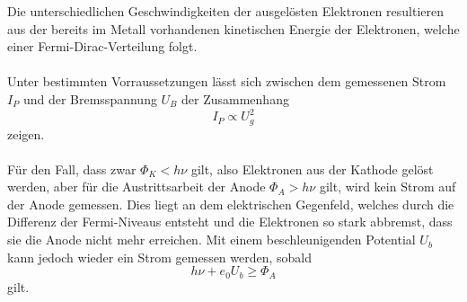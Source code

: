 \noindent
Die unterschiedlichen Geschwindigkeiten der ausgelösten Elektronen resultieren aus der bereits im Metall vorhandenen kinetischen Energie der
Elektronen, welche einer Fermi-Dirac-Verteilung folgt.
\\
\\
\noindent
Unter bestimmten Vorraussetzungen lässt sich zwischen dem gemessenen Strom $I_{P}$ und der Bremsspannung $U_B$ der Zusammenhang
\begin{equation*}
    I_{P}\propto U^2_g
\end{equation*}
zeigen.
\\
\\\noindent
Für den Fall, dass zwar $\Phi_K<h\nu$ gilt, also Elektronen aus der Kathode gelöst werden, aber für die Austrittsarbeit der Anode
$\Phi_A>h\nu$ gilt, wird kein Strom auf der Anode gemessen. Dies liegt an dem elektrischen Gegenfeld, welches durch die Differenz der
Fermi-Niveaus entsteht und die Elektronen so stark abbremst, dass sie die Anode nicht mehr erreichen.
Mit einem beschleunigenden Potential $U_b$ kann jedoch wieder ein Strom gemessen werden, sobald
\begin{equation}
    h\nu+e_0U_{b}\geq \Phi_A
    \label{eqn:ausgleichb}
\end{equation}
gilt.
